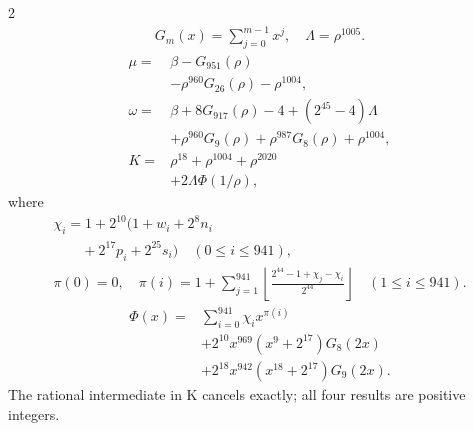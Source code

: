 \documentclass[10pt]{article}
\newcommand{\fl}[1]{\left\lfloor#1\right\rfloor}
\begin{document}
\begin{multicols}{2}
\[\begin{gathered}
G_m(x)=\sum_{j=0}^{m-1}x^j,\quad
\Lambda=\rho^{1005}.
\end{gathered}
\]
\begin{align*}
\mu={}&\beta-G_{951}(\rho)\\
&-\rho^{960}G_{26}(\rho)-\rho^{1004},\\
\omega={}&\beta+8G_{917}(\rho)-4+(2^{45}-4)\Lambda\\
&+\rho^{960}G_9(\rho)+\rho^{987}G_8(\rho)
  +\rho^{1004},\\
K={}&\rho^{18}+\rho^{1004}+\rho^{2020}\\
&+2\Lambda\Phi(1/\rho),
\end{align*}
where
\[
\begin{gathered}
\chi_i=1+2^{10}(1+w_i+2^8n_i\\
\qquad+2^{17}p_i+2^{25}s_i)\quad(0\le i\le941),\\
\pi(0)=0,\quad\pi(i)=1+\sum_{j=1}^{941}
\fl{\frac{2^{44}-1+\chi_j-\chi_i}{2^{44}}}\quad(1\le i\le941).
\end{gathered}
\]
\[
\begin{split}
\Phi(x)={}&\sum_{i=0}^{941}\chi_i x^{\pi(i)}\\
&+2^{10}x^{969}(x^9+2^{17})G_8(2x)\\
&+2^{18}x^{942}(x^{18}+2^{17})G_9(2x).
\end{split}
\]
The rational intermediate in K cancels exactly; all four results are positive integers.


\end{multicols}
\end{document}
